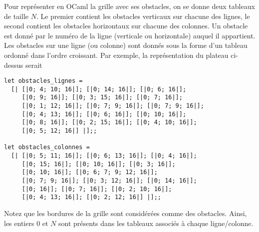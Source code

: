 \newpage

Pour représenter en OCaml la grille avec ses obstacles, on se donne
deux tableaux de taille $N$. Le premier contient les
obstacles verticaux sur chacune des lignes, le second contient les
obstacles horizontaux sur chacune des colonnes. Un obstacle est donné
par le numéro de la ligne (verticale ou horizontale) auquel il
appartient. Les obstacles sur une ligne (ou colonne) sont donnés sous la
forme d’un tableau ordonné dans l’ordre croissant.
Par exemple, la représentation du plateau ci-dessus serait
\begin{lstlisting}
let obstacles_lignes = 
  [| [|0; 4; 10; 16|]; [|0; 14; 16|]; [|0; 6; 16|];
     [|0; 9; 16|]; [|0; 3; 15; 16|]; [|0; 7; 16|]; 
     [|0; 1; 12; 16|]; [|0; 7; 9; 16|]; [|0; 7; 9; 16|]; 
     [|0; 4; 13; 16|]; [|0; 6; 16|]; [|0; 10; 16|]; 
     [|0; 8; 16|]; [|0; 2; 15; 16|]; [|0; 4; 10; 16|]; 
     [|0; 5; 12; 16|] |];;

let obstacles_colonnes = 
  [| [|0; 5; 11; 16|]; [|0; 6; 13; 16|]; [|0; 4; 16|];
     [|0; 15; 16|]; [|0; 10; 16|]; [|0; 3; 16|]; 
     [|0; 10; 16|]; [|0; 6; 7; 9; 12; 16|]; 
     [|0; 7; 9; 16|]; [|0; 3; 12; 16|]; [|0; 14; 16|]; 
     [|0; 16|]; [|0; 7; 16|]; [|0; 2; 10; 16|]; 
     [|0; 4; 13; 16|]; [|0; 2; 12; 16|] |];;
\end{lstlisting}

Notez que les bordures de la grille sont considérées comme des
obstacles. Ainsi, les entiers $0$ et $N$ sont présents dans les tableaux
associés à chaque ligne/colonne.

